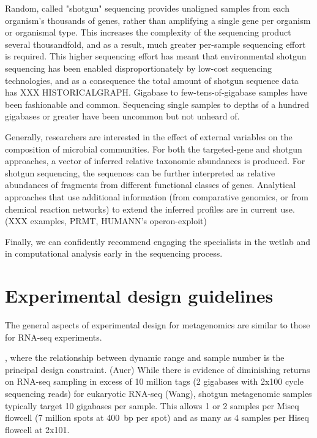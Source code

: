 \documentclass[graybox]{svmult}
\begin{document}
Random, called "shotgun" sequencing provides unaligned samples from each organism's thousands of genes, rather than amplifying a single gene per organism or organismal type.  This increases the complexity of the sequencing product several thousandfold, and as a result, much greater per-sample sequencing effort is required.
This higher sequencing effort has meant that environmental shotgun sequencing has been enabled disproportionately by low-cost sequencing technologies, and as a consequence the total amount of shotgun sequence data has XXX HISTORICALGRAPH.
Gigabase to few-tens-of-gigabase samples have been fashionable and common.  Sequencing single samples to depths of a hundred gigabases or greater have been uncommon but not unheard of.

Generally, researchers are interested in the effect of external variables on the composition of microbial communities.  For both the targeted-gene and shotgun approaches, a vector of inferred relative taxonomic abundances is produced.  For shotgun sequencing, the sequences can be further interpreted as relative abundances of fragments from different functional classes of genes.  Analytical approaches that use additional information (from comparative genomics, or from chemical reaction networks) to extend the inferred profiles are in current use.  (XXX examples, PRMT, HUMANN's operon-exploit)

Finally, we can confidently recommend engaging the specialists in the wetlab and in computational analysis early in the sequencing process.  
\section{Experimental design guidelines}
\label{sec:2}

The general aspects of experimental design for metagenomics are similar to those for RNA-seq experiments.  

, where the relationship between dynamic range and sample number is the principal design constraint. (Auer)    While there is evidence of diminishing returns on RNA-seq sampling in excess of 10 million tags (2 gigabases with 2x100 cycle sequencing reads) for eukaryotic RNA-seq (Wang), shotgun metagenomic samples typically target 10 gigabases per sample.     This allows 1 or 2 samples per Miseq flowcell  (7 million spots at 400~bp per spot) and as many as 4 samples per Hiseq flowcell at 2x101.
\end{document}
